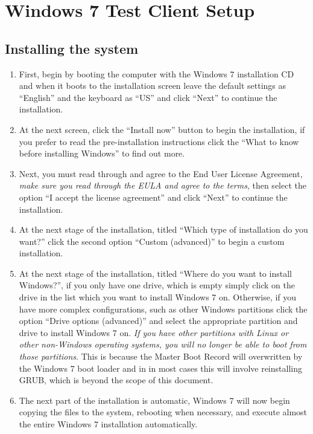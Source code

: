 \section{Windows 7 Test Client Setup}
\subsection{Installing the system}
\label{sec:windows7install}
\flushleft
\begin{enumerate}
\item	First, begin by booting the computer with the Windows 7 installation CD and when it boots to the installation screen leave the default
		settings as ``English'' and the keyboard as ``US'' and click ``Next'' to continue the installation.
		
\item	At the next screen, click the ``Install now'' button to begin the installation, if you prefer to read the pre-installation 
		instructions click the  ``What to know before installing Windows'' to find out more.
		
\item	Next, you must read through and agree to the End User License Agreement, \emph{make sure you read through the EULA and agree to
		the terms}, then select the option ``I accept the license agreement'' and click ``Next'' to continue the installation.
		
\item	At the next stage of the installation, titled ``Which type of installation do you want?'' click the second option
		``Custom (advanced)'' to begin a custom installation.
		
\item	At the next stage of the installation, titled ``Where do you want to install Windows?'', if you only have one drive, which is
		empty simply click on the drive in the list which you want to install Windows 7 on. Otherwise, if you have more complex
		configurations, such as other Windows partitions click the option ``Drive options (advanced)'' and select the appropriate
		partition and drive to install Windows 7 on. \emph{If you have other partitions with Linux or other non-Windows operating
		systems, you will no longer be able to boot from those partitions}. This is because the Master Boot Record will overwritten
		by the Windows 7 boot loader and in in most cases this will involve reinstalling GRUB, which is beyond the scope of this 
		document.
	  
\item	The next part of the installation is automatic, Windows 7 will now begin copying the files to the system, rebooting when 
		necessary, and execute almost the entire Windows 7 installation automatically.
		

\end{enumerate}
